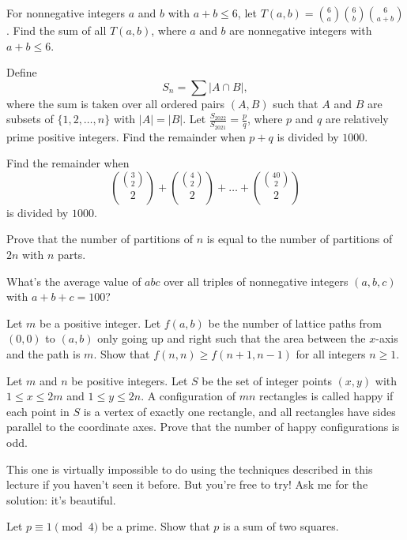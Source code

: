 \documentclass[11pt]{scrartcl}
\begin{document}
\begin{problem}[AIME I 2017/7]
	For nonnegative integers $a$ and $b$ with $a + b \leq 6$, let $T(a, b) = \binom{6}{a} \binom{6}{b} \binom{6}{a + b}$. Find the sum of all $T(a, b)$, where $a$ and $b$ are nonnegative integers with $a + b \leq 6$.
\end{problem}

\begin{problem}[AIME I 2022/12]
	Define
	\[S_n = \sum\lvert A \cap B\rvert,\]
	where the sum is taken over all ordered pairs $(A,B)$ such that $A$ and $B$ are subsets of $\{1,2,\dots,n\}$ with $\lvert A\rvert = \lvert B\rvert$. Let $\frac{S_{2022}}{S_{2021}} = \frac pq$, where $p$ and $q$ are relatively prime positive integers. Find the remainder when $p + q$ is divided by $1000$.
\end{problem}

\begin{problem}
	Find the remainder when
	\[\binom{\binom{3}{2}}{2} + \binom{\binom{4}{2}}{2} + \dots + \binom{\binom{40}{2}}{2}\]
	is divided by $1000$.
\end{problem}

\begin{problem}
	Prove that the number of partitions of $n$ is equal to the number of partitions of $2n$ with $n$ parts.
\end{problem}

\begin{problem}
	What's the average value of $abc$ over all triples of nonnegative integers $(a,b,c)$ with $a + b + c = 100$?
\end{problem}

\begin{problem}
	Let $m$ be a positive integer. Let $f(a,b)$ be the number of lattice paths from $(0,0)$ to $(a,b)$ only going up and right such that the area between the $x$-axis and the path is $m$. Show that $f(n,n) \ge f(n + 1,n - 1)$ for all integers $n \ge 1$.
\end{problem}

\begin{problem}[JMO 2024/2]
	Let $m$ and $n$ be positive integers. Let $S$ be the set of integer points $(x,y)$ with $1 \le x \le 2m$ and $1 \le y \le 2n$. A configuration of $mn$ rectangles is called happy if each point in $S$ is a vertex of exactly one rectangle, and all rectangles have sides parallel to the coordinate axes. Prove that the number of happy configurations is odd.
\end{problem}

This one is virtually impossible to do using the techniques described in this lecture if you haven't seen it before. But you're free to try! Ask me for the solution: it's beautiful.
\begin{problem}
	Let $p \equiv 1 \pmod 4$ be a prime. Show that $p$ is a sum of two squares.
\end{problem}
\end{document}
